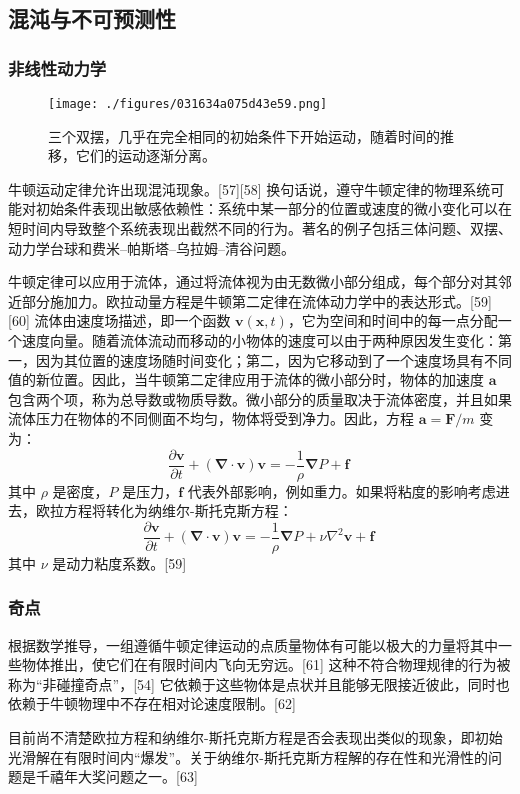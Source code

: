 \subsection{混沌与不可预测性}  
\subsubsection{非线性动力学} 
\begin{figure}[ht]
\centering
\texttt{[image: ./figures/031634a075d43e59.png]}
\caption{三个双摆，几乎在完全相同的初始条件下开始运动，随着时间的推移，它们的运动逐渐分离。} \label{fig_NEW01_10}
\end{figure}
牛顿运动定律允许出现混沌现象。[57][58] 换句话说，遵守牛顿定律的物理系统可能对初始条件表现出敏感依赖性：系统中某一部分的位置或速度的微小变化可以在短时间内导致整个系统表现出截然不同的行为。著名的例子包括三体问题、双摆、动力学台球和费米–帕斯塔–乌拉姆–清谷问题。

牛顿定律可以应用于流体，通过将流体视为由无数微小部分组成，每个部分对其邻近部分施加力。欧拉动量方程是牛顿第二定律在流体动力学中的表达形式。[59][60] 流体由速度场描述，即一个函数 \( \mathbf{v}(\mathbf{x}, t) \)，它为空间和时间中的每一点分配一个速度向量。随着流体流动而移动的小物体的速度可以由于两种原因发生变化：第一，因为其位置的速度场随时间变化；第二，因为它移动到了一个速度场具有不同值的新位置。因此，当牛顿第二定律应用于流体的微小部分时，物体的加速度 \( \mathbf{a} \) 包含两个项，称为总导数或物质导数。微小部分的质量取决于流体密度，并且如果流体压力在物体的不同侧面不均匀，物体将受到净力。因此，方程 \( \mathbf{a} = \mathbf{F}/m \) 变为：
\[
\frac{\partial \mathbf{v}}{\partial t} + (\mathbf{\nabla} \cdot \mathbf{v})\mathbf{v} = -\frac{1}{\rho} \mathbf{\nabla} P + \mathbf{f}~
\]
其中 \( \rho \) 是密度，\( P \) 是压力，\( \mathbf{f} \) 代表外部影响，例如重力。如果将粘度的影响考虑进去，欧拉方程将转化为纳维尔-斯托克斯方程：
\[
\frac{\partial \mathbf{v}}{\partial t} + (\mathbf{\nabla} \cdot \mathbf{v})\mathbf{v} = -\frac{1}{\rho} \mathbf{\nabla} P + \nu \nabla^2 \mathbf{v} + \mathbf{f}~
\]
其中 \( \nu \) 是动力粘度系数。[59]
\subsubsection{奇点}  
根据数学推导，一组遵循牛顿定律运动的点质量物体有可能以极大的力量将其中一些物体推出，使它们在有限时间内飞向无穷远。[61] 这种不符合物理规律的行为被称为“非碰撞奇点”，[54] 它依赖于这些物体是点状并且能够无限接近彼此，同时也依赖于牛顿物理中不存在相对论速度限制。[62]

目前尚不清楚欧拉方程和纳维尔-斯托克斯方程是否会表现出类似的现象，即初始光滑解在有限时间内“爆发”。关于纳维尔-斯托克斯方程解的存在性和光滑性的问题是千禧年大奖问题之一。[63]
